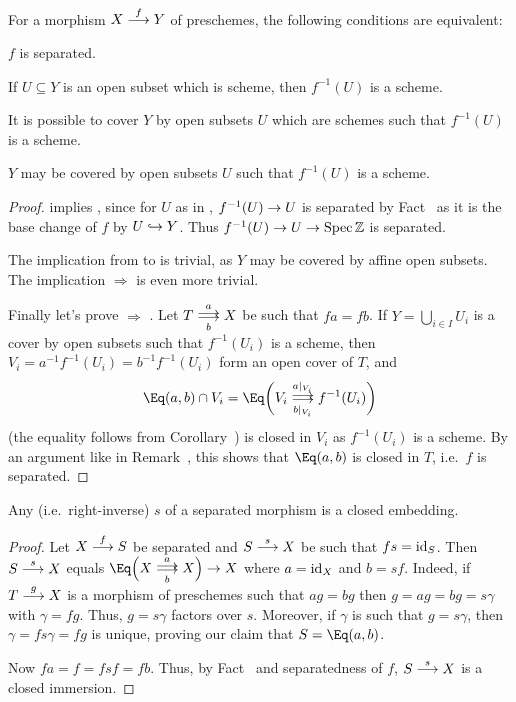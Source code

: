 \documentclass[a4paper,parskip=half,numbers=enddot, DIV=12]{scrreprt}
\begin{document}
\begin{fact}
    For a morphism $X\morphism[f] Y$ of preschemes, the following conditions are equivalent:
    \begin{alphanumerate}
    \item 
        $f$ is separated.
    \item 
        If $U\subseteq Y$ is an open subset which is scheme, then $f^{-1}(U)$ is a scheme.
    \item 
        It is possible to cover $Y$ by open subsets $U$ which are schemes such that $f^{-1}(U)$ is a scheme.
     \item
	     $Y$ may be covered by open subsets $U$ such that $f^{-1}(U)$ is a scheme.
    \end{alphanumerate}
\end{fact}
\begin{proof}
     implies , since for $U$ as in , $f^{-1}(U)\morphism U$ is separated by Fact~ as it is the base change of $f$ by $U\monomorphism Y$. Thus $f^{-1}(U)\morphism U\morphism \Spec\IZ$ is separated.
    
    The implication from  to  is trivial, as $Y$ may be covered by affine open subsets. The implication  $\Rightarrow$  is even more trivial.
    
    Finally let's prove  $\Rightarrow$ . Let $T\doublemorphism[a][b] X$ be such that $fa = fb$. If $Y=\bigcup_{i\in I} U_i$ is a cover by open subsets such that $f^{-1}(U_i)$ is a scheme, then $V_i = a^{-1}f^{-1}(U_i) = b^{-1}f^{-1} (U_i)$ form an open cover of $T$, and 
    \begin{align*}
    	\Eq(a,b) \cap V_i = \Eq\bigg(V_i\doublemorphism[a|_{V_i}][b|_{V_i}]f^{-1}(U_i) \bigg)
    \end{align*}
    (the equality follows from Corollary~) is closed in $V_i$ as $f^{-1}(U_i) $ is a scheme. By an argument like in Remark~, this shows that $\Eq(a,b)$ is closed in $T$, i.e.\ $f$ is separated.
\end{proof}
\begin{prop}
    Any  (i.e.\ right-inverse) $s$ of a separated morphism is a closed embedding. 
\end{prop}
\begin{proof}
    Let $X\morphism[f] S$ be separated and $S\morphism[s] X$ be such that $fs = \operatorname{id}_S$. Then $S\morphism[s] X$ equals $\Eq\Big(X\doublemorphism[a][b] X\Big)\morphism X$ where $a=\operatorname{id}_X$ and $b= sf$. Indeed, if $T\morphism[g] X$ is a morphism of preschemes such that $ag = bg$ then $g = ag = bg = s\gamma$ with $\gamma = fg$. Thus, $g = s\gamma$ factors over $s$. Moreover, if $\gamma$ is such that $g= s\gamma$, then $\gamma = fs\gamma = fg$ is unique, proving our claim that $S=\Eq(a,b)$.
    
     Now $fa = f = fsf = fb$. Thus, by Fact~ and separatedness of $f$, $S\morphism[s] X$ is a closed immersion.
\end{proof}
\end{document}
